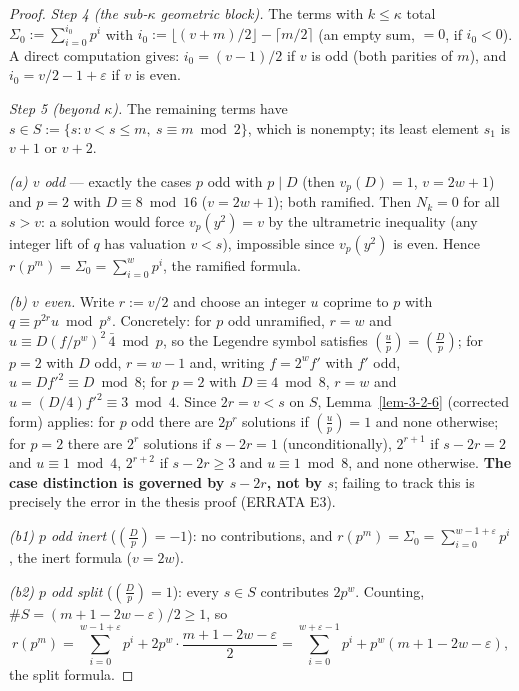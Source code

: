 \begin{proof}
\emph{Step 4 (the sub-$\kappa$ geometric block).} The terms with $k \leq \kappa$
total $\Sigma_0 := \sum_{i=0}^{i_0} p^i$ with
$i_0 := \lfloor (v+m)/2 \rfloor - \lceil m/2 \rceil$ (an empty sum, $= 0$, if
$i_0 < 0$). A direct computation gives: $i_0 = (v-1)/2$ if $v$ is odd (both parities
of $m$), and $i_0 = v/2 - 1 + \varepsilon$ if $v$ is even.

\emph{Step 5 (beyond $\kappa$).} The remaining terms have
$s \in S := \{s : v < s \leq m,\ s \equiv m \bmod 2\}$, which is nonempty; its least
element $s_1$ is $v+1$ or $v+2$.

\emph{(a) $v$ odd} --- exactly the cases $p$ odd with $p \mid D$ (then $v_p(D) = 1$,
$v = 2w+1$) and $p = 2$ with $D \equiv 8 \bmod 16$ ($v = 2w+1$); both ramified. Then
$N_k = 0$ for all $s > v$: a solution would force $v_p(y^2) = v$ by the ultrametric
inequality (any integer lift of $q$ has valuation $v < s$), impossible since
$v_p(y^2)$ is even. Hence $r(p^m) = \Sigma_0 = \sum_{i=0}^{w} p^i$, the ramified
formula.

\emph{(b) $v$ even.} Write $r := v/2$ and choose an integer $u$ coprime to $p$ with
$q \equiv p^{2r} u \bmod p^s$. Concretely: for $p$ odd unramified, $r = w$ and
$u \equiv D (f/p^w)^2\, \bar 4 \bmod p$, so the Legendre symbol satisfies
$(\tfrac up) = (\tfrac Dp)$; for $p = 2$ with $D$ odd, $r = w - 1$ and, writing
$f = 2^w f'$ with $f'$ odd, $u = D f'^2 \equiv D \bmod 8$; for $p = 2$ with
$D \equiv 4 \bmod 8$, $r = w$ and $u = (D/4) f'^2 \equiv 3 \bmod 4$. Since
$2r = v < s$ on $S$, Lemma~\ref{lem-3-2-6} (corrected form) applies: for $p$ odd
there are $2p^r$ solutions if $(\tfrac up) = 1$ and none otherwise; for $p = 2$
there are $2^r$ solutions if $s - 2r = 1$ (unconditionally), $2^{r+1}$ if
$s - 2r = 2$ and $u \equiv 1 \bmod 4$, $2^{r+2}$ if $s - 2r \geq 3$ and
$u \equiv 1 \bmod 8$, and none otherwise. \textbf{The case distinction is governed by
$s - 2r$, not by $s$}; failing to track this is precisely the error in the thesis
proof (ERRATA E3).

\emph{(b1) $p$ odd inert} ($(\tfrac Dp) = -1$): no contributions, and
$r(p^m) = \Sigma_0 = \sum_{i=0}^{w-1+\varepsilon} p^i$, the inert formula
($v = 2w$).

\emph{(b2) $p$ odd split} ($(\tfrac Dp) = 1$): every $s \in S$ contributes $2p^w$.
Counting, $\#S = (m + 1 - 2w - \varepsilon)/2 \geq 1$, so
\[
r(p^m) = \sum_{i=0}^{w-1+\varepsilon} p^i
+ 2p^w \cdot \frac{m + 1 - 2w - \varepsilon}{2}
= \sum_{i=0}^{w+\varepsilon-1} p^i + p^w (m + 1 - 2w - \varepsilon),
\]
the split formula.


\end{proof}
